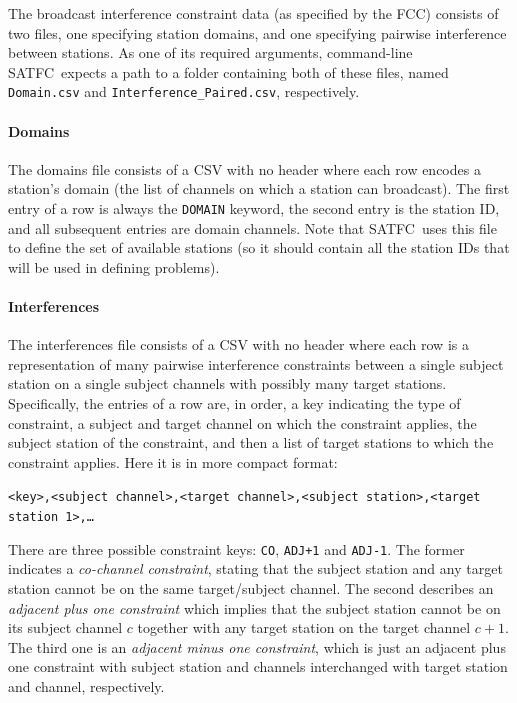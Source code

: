 \documentclass[
10pt, %
letterpaper, %
oneside, %
headinclude,footinclude, %
BCOR5mm, %
needspace, %
]{scrartcl}
\newcommand{\SATFC}{\textsc{SATFC}~}
\begin{document}
The broadcast interference constraint data (as specified by the FCC) consists of two files, one specifying station domains, and one specifying pairwise interference between stations. As one of its required arguments, command-line \SATFC expects a path to a folder containing both of these files, named \texttt{Domain.csv} and \texttt{Interference\_Paired.csv}, respectively.

\paragraph{Domains} The domains file consists of a CSV with no header where each row encodes a station's domain (the list of channels on which a station can broadcast). The first entry of a row is always the \texttt{DOMAIN} keyword, the second entry is the station ID, and all subsequent entries are domain channels. Note that \SATFC uses this file to define the set of available stations (so it should contain all the station IDs that will be used in defining problems).

\paragraph{Interferences} The interferences file consists of a CSV with no header where each row is a representation of many pairwise interference constraints between a single subject station on a single subject channels with possibly many target stations. Specifically, the entries of a row are, in order, a key indicating the type of constraint, a subject and target channel on which the constraint applies, the subject station of the constraint, and then a list of target stations to which the constraint applies. Here it is in more compact format:
\begin{center}
\texttt{<key>,<subject channel>,<target channel>,<subject station>,<target station 1>,\ldots}
\end{center}
There are three possible constraint keys: \texttt{CO}, \texttt{ADJ+1} and \texttt{ADJ-1}. The former indicates a \emph{co-channel constraint}, stating that the subject station and any target station cannot be on the same target/subject channel. The second describes an \emph{adjacent plus one constraint} which implies that the subject station cannot be on its subject channel $c$ together with any target station on the target channel $c+1$. The third one is an \emph{adjacent minus one constraint}, which is just an adjacent plus one constraint with subject station and channels interchanged with target station and channel, respectively.
\end{document}
